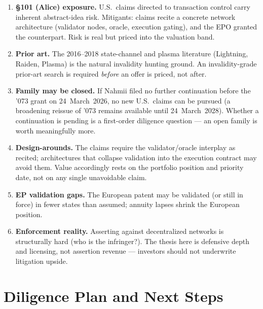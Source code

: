 \documentclass[11pt,a4paper]{article}
\begin{document}
\begin{enumerate}[leftmargin=1.6em]
  \item \textbf{\S101 (Alice) exposure.} U.S.\ claims directed to
  transaction control carry inherent abstract-idea risk. Mitigants:
  claims recite a concrete network architecture (validator nodes,
  oracle, execution gating), and the EPO granted the counterpart. Risk
  is real but priced into the valuation band.
  \item \textbf{Prior art.} The 2016--2018 state-channel and plasma
  literature (Lightning, Raiden, Plasma) is the natural invalidity
  hunting ground. An invalidity-grade prior-art search is required
  \emph{before} an offer is priced, not after.
  \item \textbf{Family may be closed.} If Nahmii filed no further
  continuation before the '073 grant on 24~March~2026, no new U.S.\
  claims can be pursued (a broadening reissue of '073 remains available
  until 24~March~2028). Whether a continuation is pending is a
  first-order diligence question --- an open family is worth
  meaningfully more.
  \item \textbf{Design-arounds.} The claims require the
  validator/oracle interplay as recited; architectures that collapse
  validation into the execution contract may avoid them. Value
  accordingly rests on the portfolio position and priority date, not on
  any single unavoidable claim.
  \item \textbf{EP validation gaps.} The European patent may be
  validated (or still in force) in fewer states than assumed; annuity
  lapses shrink the European position.
  \item \textbf{Enforcement reality.} Asserting against decentralized
  networks is structurally hard (who is the infringer?). The thesis
  here is defensive depth and licensing, not assertion revenue ---
  investors should not underwrite litigation upside.
\end{enumerate}

\section{Diligence Plan and Next Steps}
\end{document}
